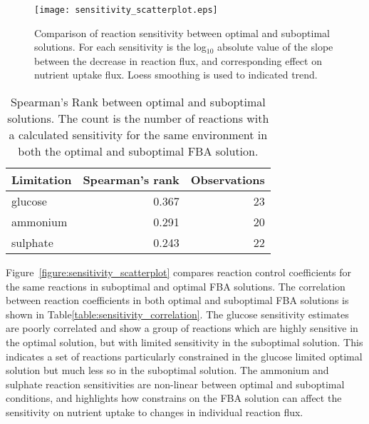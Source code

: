 
\begin{figure}%
  \centering
  \texttt{[image: sensitivity\_scatterplot.eps]}
  \caption[Comparison of reaction sensitivity between optimal and suboptimal solutions]{Comparison of reaction sensitivity between optimal and suboptimal solutions. For each sensitivity is the log$_{10}$ absolute value of the slope between the decrease in reaction flux, and corresponding effect on nutrient uptake flux. Loess smoothing is used to indicated trend. }
  \label{figure:sensitivity_scatterplot}
\end{figure}%

\begin{table}%
  \centering
  \begin{tabular}{l r r}
                                                    \toprule
    Limitation  & Spearman's rank & Observations \\ \midrule
    glucose     & 0.367           & 23           \\
    ammonium    & 0.291           & 20           \\
    sulphate    & 0.243           & 22           \\ \bottomrule
  \end{tabular}
  \caption[Spearman's Rank between optimal and suboptimal solutions]{Spearman's Rank between optimal and suboptimal solutions. The count is the number of reactions with a calculated sensitivity for the same environment in both the optimal and suboptimal FBA solution. }
  \label{table:sensitivity_correlation}
\end{table}%


Figure~\vref{figure:sensitivity_scatterplot} compares reaction control coefficients for the same reactions in suboptimal and optimal FBA solutions. The correlation between reaction coefficients in both optimal and suboptimal FBA solutions is shown in Table\vref{table:sensitivity_correlation}. The glucose sensitivity estimates are poorly correlated and show a group of reactions which are highly sensitive in the optimal solution, but with limited sensitivity in the suboptimal solution. This indicates a set of reactions particularly constrained in the glucose limited optimal solution but much less so in the suboptimal solution. The ammonium and sulphate reaction sensitivities are non-linear between optimal and suboptimal conditions, and highlights how constrains on the FBA solution can affect the sensitivity on nutrient uptake to changes in individual reaction flux.

